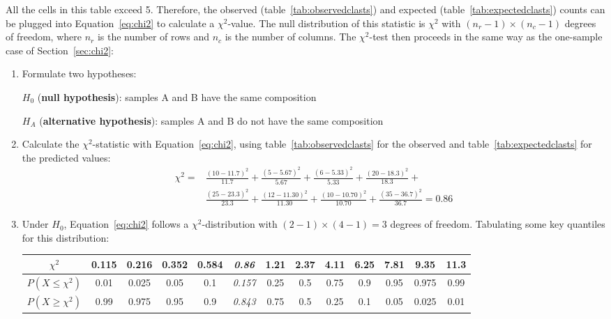 All the cells in this table exceed 5. Therefore, the observed
(table~\ref{tab:observedclasts}) and expected
(table~\ref{tab:expectedclasts}) counts can be plugged into
Equation~\ref{eq:chi2} to calculate a $\chi^2$-value. The null
distribution of this statistic is $\chi^2$ with $(n_r-1)\times(n_c-1)$
degrees of freedom, where $n_r$ is the number of rows and $n_c$ is the
number of columns.  The $\chi^2$-test then proceeds in the same way as
the one-sample case of Section~\ref{sec:chi2}:

\begin{enumerate}
\item  Formulate two hypotheses:

  $H_0$ (\textbf{null hypothesis}): samples A and B have the same composition

  $H_{\!A}$ (\textbf{alternative hypothesis}):
  samples A and B do not have the same composition
  
\item Calculate the $\chi^2$-statistic with Equation~\ref{eq:chi2},
  using table~\ref{tab:observedclasts} for the observed and
  table~\ref{tab:expectedclasts} for the predicted values:
  \begin{equation}
    \begin{split}
      \chi^2 = &
      \frac{(10-11.7)^2}{11.7} + \frac{(5-5.67)^2}{5.67} +
      \frac{(6-5.33)^2}{5.33} + \frac{(20-18.3)^2}{18.3} + \\
      & \frac{(25-23.3)^2}{23.3} + \frac{(12-11.30)^2}{11.30} +
      \frac{(10-10.70)^2}{10.70} + \frac{(35-36.7)^2}{36.7} = 0.86
    \end{split}
  \end{equation}

\item Under $H_0$, Equation~\ref{eq:chi2} follows a
  $\chi^2$-distribution with $(2-1)\times(4-1)=3$ degrees of
  freedom. Tabulating some key quantiles for this distribution:

  \begin{center}
    \begin{tabular}{c|c@{\gap}c@{\gap}c@{\gap}c@{\gap}
        c@{\gap}c@{\gap}c@{\gap}c@{\gap}c@{\gap}c@{\gap}c@{\gap}c}
      $\chi^2$ & 0.115 & 0.216 & 0.352 & 0.584 & \textit{0.86} &
      1.21 & 2.37 & 4.11 & 6.25 & 7.81 & 9.35 & 11.3 \\ \hline
      $P(X\leq{\chi^2})$ & 0.01 & 0.025 & 0.05 & 0.1 & \textit{0.157} &
      0.25 & 0.5 & 0.75 & 0.9 & 0.95 & 0.975 & 0.99 \\
      $P(X\geq{\chi^2})$ & 0.99 & 0.975 & 0.95 & 0.9 & \textit{0.843} & 
      0.75 & 0.5 & 0.25 & 0.1 & 0.05 & 0.025 & 0.01
    \end{tabular}
  \end{center}


\end{enumerate}

